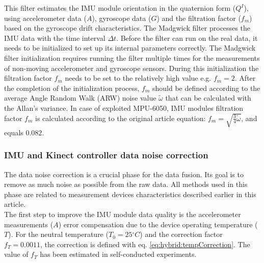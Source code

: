\documentclass[sensors,article,submit,moreauthors,pdftex,10pt,a4paper]{mdpi}
\newcommand{\degree}{\ensuremath{{}^{\circ}}\xspace}
\begin{document}
This filter estimates the IMU module orientation in the quaternion form ($Q^I$), using accelerometer data ($A$), gyroscope data ($G$) and the filtration factor ($f_m$) based on the gyroscope drift characteristics. The Madgwick filter processes the IMU data with the time interval $\Delta t$. Before the filter can run on the real data, it needs to be initialized to set up its internal parameters correctly. The Madgwick filter initialization requires running the filter multiple times for the measurements of non-moving accelerometer and gyroscope sensors. During this initialization the filtration factor $f_m$ needs to be set to the relatively high value e.g. $f_m = 2$. After the completion of the initialization process, $f_m$ should be defined according to the average Angle Random Walk (ARW) noise value $\widetilde{\omega}$ that can be calculated with the Allan’s variance\cite{FreescaleSemiconductor2015,Allan1966,Allan1987}. In case of exploited MPU-6050, IMU modules filtration factor $f_m$ is calculated according to the original article \cite{Madgwick2011} equation: $f_m = \sqrt{\frac{3}{4}\widetilde{\omega}}$, and equals $0.082$. 
		
\subsubsection{IMU and Kinect controller data noise correction}
The data noise correction is a crucial phase for the data fusion. Its goal is to remove as much noise as possible from the raw data. All methods used in this phase are related to measurement devices characteristics described earlier in this article.\\
The first step to improve the IMU module data quality is the accelerometer measurements ($A$) error compensation due to the device operating temperature ($T$). For the neutral temperature ($T_0=25\degree C$) and the correction factor $f_T= 0.0011$, the correction is defined with eq. \ref{eq:hybrid:tempCorrection}. The value of $f_T$ has been estimated in self-conducted experiments.
		
\end{document}
